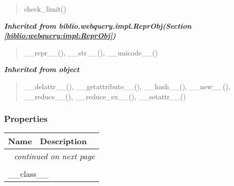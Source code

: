 \begin{quote}
check\_limit()
\end{quote}

\large{\textbf{\textit{Inherited from biblio.webquery.impl.ReprObj\textit{(Section \ref{biblio:webquery:impl:ReprObj})}}}}

\begin{quote}
\_\_repr\_\_(), \_\_str\_\_(), \_\_unicode\_\_()
\end{quote}

\large{\textbf{\textit{Inherited from object}}}

\begin{quote}
\_\_delattr\_\_(), \_\_getattribute\_\_(), \_\_hash\_\_(), \_\_new\_\_(), \_\_reduce\_\_(), \_\_reduce\_ex\_\_(), \_\_setattr\_\_()
\end{quote}


  \subsubsection{Properties}

    \vspace{-1cm}
\hspace{\varindent}\begin{longtable}{|p{\varnamewidth}|p{\vardescrwidth}|l}
\cline{1-2}
\cline{1-2} \centering \textbf{Name} & \centering \textbf{Description}& \\
\cline{1-2}
\endhead\cline{1-2}\multicolumn{3}{r}{\small\textit{continued on next page}}\\\endfoot\cline{1-2}
\endlastfoot\multicolumn{2}{|l|}{\textit{Inherited from object}}\\
\multicolumn{2}{|p{\varwidth}|}{\raggedright \_\_class\_\_}\\
\cline{1-2}
\end{longtable}



